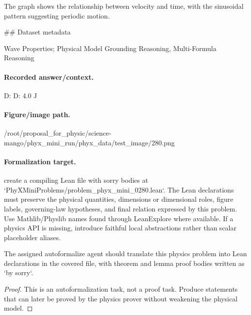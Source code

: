The graph shows the relationship between velocity and time, with the sinusoidal pattern suggesting periodic motion.

\#\# Dataset metadata

Wave Properties; Physical Model Grounding Reasoning, Multi-Formula Reasoning

\paragraph{Recorded answer/context.}
D: D: 4.0 J

\paragraph{Figure/image path.}
/root/proposal\_for\_physic/science-mango/phyx\_mini\_run/phyx\_data/test\_image/280.png

\paragraph{Formalization target.}
create a compiling Lean file with sorry bodies at `PhyXMiniProblems/problem\_phyx\_mini\_0280.lean`. The Lean declarations must preserve the physical quantities, dimensions or dimensional roles, figure labels, governing-law hypotheses, and final relation expressed by this problem.
Use Mathlib/Physlib names found through LeanExplore where available. If a physics API is missing, introduce faithful local abstractions rather than scalar placeholder aliases.

\begin{theorem}
\label{thm:physics:phyx_mini_0280:target}
The assigned autoformalize agent should translate this physics problem into Lean declarations in the covered file, with theorem and lemma proof bodies written as `by sorry`.
\end{theorem}
\begin{proof}
This is an autoformalization task, not a proof task. Produce statements that can later be proved by the physics prover without weakening the physical model.
\end{proof}


